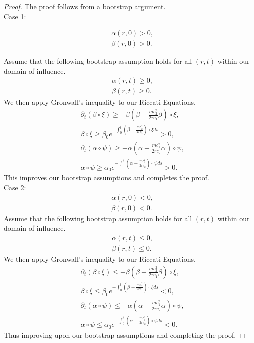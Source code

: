 \documentclass[11pt]{article}
\begin{document}
\begin{proof}
The proof follows from a bootstrap argument. 
\\
Case 1: 

\begin{align}
	&\alpha(r,0) > 0, 
	\\
	&\beta(r,0) > 0.
\end{align} 

Assume that the following bootstrap assumption holds for all $(r, t)$ within our domain of influence. 
\begin{align}
	&\alpha(r,t) \geq 0, 
	\\
	&\beta(r,t) \geq 0.
\end{align} 
We then apply Gronwall's inequality to our Riccati Equations. 
\begin{align}
	&\partial_t(\beta\circ\xi) \geq -\beta\left(\beta + \frac{mc_2^2}{2rc_1}\beta\right) \circ\xi, 
	\\
	&\beta\circ\xi \geq \beta_0 e^{-\int_0^t \left( \beta + \frac{mc_2^2}{2rc_1} \right)\circ\xi ds} > 0, 
	\\
	&\partial_t(\alpha\circ\psi) \geq -\alpha\left(\alpha + \frac{mc_1^2}{2rc_2}\alpha\right) \circ\psi, 
	\\
	&\alpha\circ\psi \geq \alpha_0 e^{-\int_0^t \left( \alpha + \frac{mc_1^2}{2rc_2} \right)\circ\psi ds} > 0. 
\end{align} 
This improves our bootstrap assumptions and completes the proof. 
\bigskip
\\
Case 2: 
\begin{align}
	&\alpha(r,0) < 0, 
	\\
	&\beta(r,0) < 0.
\end{align} 
Assume that the following bootstrap assumption holds for all $(r, t)$ within our domain of influence. 
\begin{align}
	&\alpha(r,t) \leq 0, 
	\\
	&\beta(r,t) \leq 0.
\end{align} 
We then apply Gronwall's inequality to our Riccati Equations. 
\begin{align}
	&\partial_t(\beta\circ\xi) \leq -\beta\left(\beta + \frac{mc_2^2}{2rc_1}\beta\right) \circ\xi, 
	\\
	&\beta\circ\xi \leq \beta_0 e^{-\int_0^t \left( \beta + \frac{mc_2^2}{2rc_1} \right)\circ\xi ds} < 0, 
	\\
	&\partial_t(\alpha\circ\psi) \leq -\alpha\left(\alpha + \frac{mc_1^2}{2rc_2}\alpha\right) \circ\psi, 
	\\
	&\alpha\circ\psi \leq \alpha_0 e^{-\int_0^t \left( \alpha + \frac{mc_1^2}{2rc_2} \right)\circ\psi ds} < 0. 
\end{align} 
Thus improving upon our bootstrap assumptions and completing the proof. 
\end{proof} 
\end{document}
